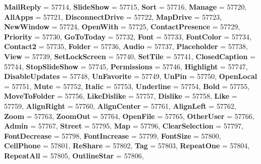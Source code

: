\begin{DoxyCompactItemize}
\newline
{\bfseries Mail\+Reply} = 57714, 
{\bfseries Slide\+Show} = 57715, 
{\bfseries Sort} = 57716, 
{\bfseries Manage} = 57720, 
\newline
{\bfseries All\+Apps} = 57721, 
{\bfseries Disconnect\+Drive} = 57722, 
{\bfseries Map\+Drive} = 57723, 
{\bfseries New\+Window} = 57724, 
\newline
{\bfseries Open\+With} = 57725, 
{\bfseries Contact\+Presence} = 57729, 
{\bfseries Priority} = 57730, 
{\bfseries Go\+To\+Today} = 57732, 
\newline
{\bfseries Font} = 57733, 
{\bfseries Font\+Color} = 57734, 
{\bfseries Contact2} = 57735, 
{\bfseries Folder} = 57736, 
\newline
{\bfseries Audio} = 57737, 
{\bfseries Placeholder} = 57738, 
{\bfseries View} = 57739, 
{\bfseries Set\+Lock\+Screen} = 57740, 
\newline
{\bfseries Set\+Tile} = 57741, 
{\bfseries Closed\+Caption} = 57744, 
{\bfseries Stop\+Slide\+Show} = 57745, 
{\bfseries Permissions} = 57746, 
\newline
{\bfseries Highlight} = 57747, 
{\bfseries Disable\+Updates} = 57748, 
{\bfseries Un\+Favorite} = 57749, 
{\bfseries Un\+Pin} = 57750, 
\newline
{\bfseries Open\+Local} = 57751, 
{\bfseries Mute} = 57752, 
{\bfseries Italic} = 57753, 
{\bfseries Underline} = 57754, 
\newline
{\bfseries Bold} = 57755, 
{\bfseries Move\+To\+Folder} = 57756, 
{\bfseries Like\+Dislike} = 57757, 
{\bfseries Dislike} = 57758, 
\newline
{\bfseries Like} = 57759, 
{\bfseries Align\+Right} = 57760, 
{\bfseries Align\+Center} = 57761, 
{\bfseries Align\+Left} = 57762, 
\newline
{\bfseries Zoom} = 57763, 
{\bfseries Zoom\+Out} = 57764, 
{\bfseries Open\+File} = 57765, 
{\bfseries Other\+User} = 57766, 
\newline
{\bfseries Admin} = 57767, 
{\bfseries Street} = 57795, 
{\bfseries Map} = 57796, 
{\bfseries Clear\+Selection} = 57797, 
\newline
{\bfseries Font\+Decrease} = 57798, 
{\bfseries Font\+Increase} = 57799, 
{\bfseries Font\+Size} = 57800, 
{\bfseries Cell\+Phone} = 57801, 
\newline
{\bfseries Re\+Share} = 57802, 
{\bfseries Tag} = 57803, 
{\bfseries Repeat\+One} = 57804, 
{\bfseries Repeat\+All} = 57805, 
\newline
{\bfseries Outline\+Star} = 57806, 

\end{DoxyCompactItemize}
